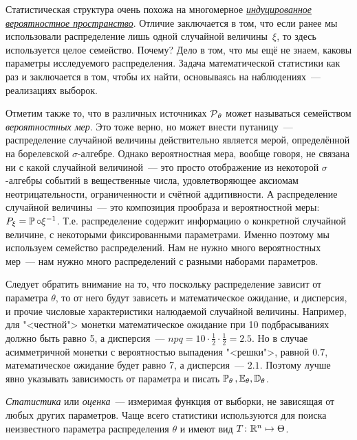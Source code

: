 \begin{rmrk}
    Статистическая структура очень похожа на многомерное \hyperlink{induced_prob_space}{\textit{индуцированное вероятностное пространство}}.
    Отличие заключается в том, что если ранее мы использовали распределение лишь одной случайной величины~$\xi$, то здесь используется целое семейство.
    Почему?
    Дело в том, что мы ещё не знаем, каковы параметры исследуемого распределения.
    Задача математической статистики как раз и заключается в том, чтобы их найти, основываясь на наблюдениях~--- реализациях выборок.

    Отметим также то, что в различных источниках $\operatorname{\mathcal{P}}_\theta$ может называться семейством \textit{вероятностных мер}.
    Это тоже верно, но может внести путаницу~--- распределение случайной величины действительно является мерой, определённой на борелевской $\sigma$-алгебре.
    Однако вероятностная мера, вообще говоря, не связана ни с какой случайной величиной~--- это просто отображение из некоторой $\sigma$-алгебры событий в вещественные числа, удовлетворяющее аксиомам неотрицательности, ограниченности и счётной аддитивности.
    А распределение случайной величины~--- это композиция прообраза и вероятностной меры: $P_{\xi} = \operatorname{\mathbb{P}} \circ \xi^{-1}$.
    Т.е. распределение содержит информацию о конкретной случайной величине, с некоторыми фиксированными параметрами.
    Именно поэтому мы используем семейство распределений.
    Нам не нужно много вероятностных мер~--- нам нужно много распределений с разными наборами параметров.

    Следует обратить внимание на то, что поскольку распределение зависит от параметра $\theta$, то от него будут зависеть и математическое ожидание, и дисперсия, и прочие числовые характеристики налюдаемой случайной величины.
    Например, для "<честной"> монетки математическое ожидание при 10 подбрасываниях должно быть равно 5, а дисперсия~--- $npq = 10 \cdot \frac{1}{2} \cdot \frac{1}{2} = 2.5$. 
    Но в случае асимметричной монетки с вероятностью выпадения "<решки">, равной $0.7$, математическое ожидание будет равно 7, а дисперсия~--- $2.1$.
    Поэтому лучше явно указывать зависимость от параметра и писать $\operatorname{\operatorname{\mathbb{P}}_{\theta}}\,, \operatorname{\operatorname{\mathbb{E}}_{\theta}}, \operatorname{\mathbb{D}_{\theta}}$.
\end{rmrk}

\begin{defn}
    \textit{Статистика} или \textit{оценка}~--- измеримая функция от выборки, не зависящая от любых других параметров. Чаще всего статистики используются для поиска неизвестного параметра распределения $\theta$ и имеют вид $T\colon \mathbb{R}^n \mapsto \Theta$.
\end{defn}

